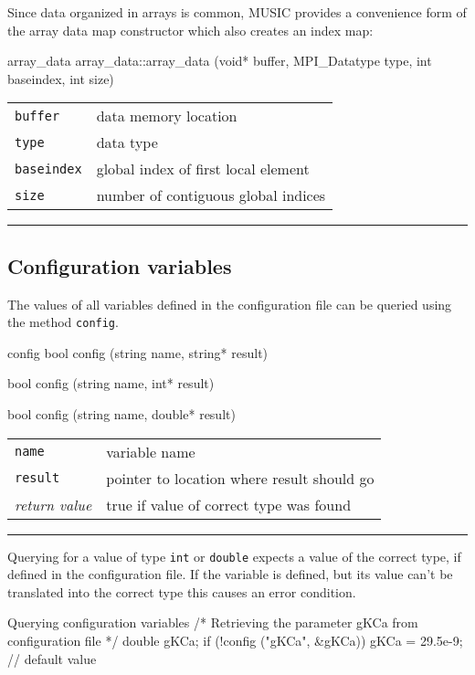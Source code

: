 \documentclass[a4paper]{report}
\makeatletter
\newenvironment{parameters}%
{\begin{tabular}{@{\hspace{2em}}lp{0.6\textwidth}}}%
{\end{tabular}\par\vspace{1mm}\par\hrule\par\vspace{5mm}}
\makeatother
\begin{document}
Since data organized in arrays is common, MUSIC provides a convenience
form of the array data map constructor which also creates an index
map:

\begin{head}{array_data}
  array_data::array_data (void* buffer,
                          MPI_Datatype type,
                          int  baseindex,
                          int size)
\end{head}
\begin{parameters}
  \lstinline|buffer|    & data memory location \\
  \lstinline|type|	& data type \\
  \lstinline|baseindex| & global index of first local element \\
  \lstinline|size|      & number of contiguous global indices \\
\end{parameters}


\subsection{Configuration variables}

The values of all variables defined in the configuration file can be
queried using the method \lstinline|config|.

\begin{head}{config}
  bool config (string name, string* result)

  bool config (string name, int* result)

  bool config (string name, double* result)
\end{head}
\begin{parameters}
  \lstinline|name|     & variable name \\
  \lstinline|result|  & pointer to location where result should go \\
  \emph{return value} & true if value of correct type was found \\
\end{parameters}

Querying for a value of type \lstinline|int| or \lstinline|double|
expects a value of the correct type, if defined in the configuration
file.  If the variable is defined, but its value can't be translated
into the correct type this causes an error condition.

\begin{code}{Querying configuration variables}
/* Retrieving the parameter gKCa
   from configuration file */
double gKCa;
if (!config ("gKCa", &gKCa))
  gKCa = 29.5e-9; // default value
\end{code}
\end{document}
